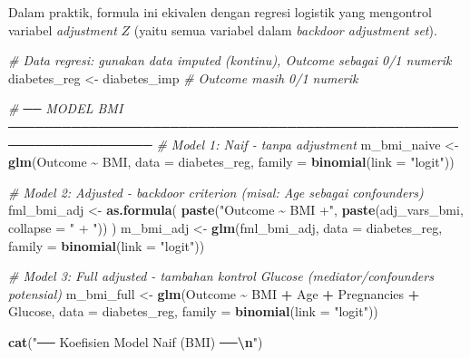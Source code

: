 \documentclass[
  11pt,
]{article}
\newenvironment{Shaded}{\begin{snugshade}}{\end{snugshade}}
\newcommand{\AttributeTok}[1]{\textcolor[rgb]{0.13,0.29,0.53}{#1}}
\newcommand{\CommentTok}[1]{\textcolor[rgb]{0.56,0.35,0.01}{\textit{#1}}}
\newcommand{\FunctionTok}[1]{\textcolor[rgb]{0.13,0.29,0.53}{\textbf{#1}}}
\newcommand{\NormalTok}[1]{#1}
\newcommand{\OtherTok}[1]{\textcolor[rgb]{0.56,0.35,0.01}{#1}}
\newcommand{\SpecialCharTok}[1]{\textcolor[rgb]{0.81,0.36,0.00}{\textbf{#1}}}
\newcommand{\StringTok}[1]{\textcolor[rgb]{0.31,0.60,0.02}{#1}}
\begin{document}
Dalam praktik, formula ini ekivalen dengan regresi logistik yang
mengontrol variabel \emph{adjustment} \(Z\) (yaitu semua variabel dalam
\emph{backdoor adjustment set}).

\begin{Shaded}
\begin{Highlighting}[]
\CommentTok{\# Data regresi: gunakan data imputed (kontinu), Outcome sebagai 0/1 numerik}
\NormalTok{diabetes\_reg }\OtherTok{\textless{}{-}}\NormalTok{ diabetes\_imp   }\CommentTok{\# Outcome masih 0/1 numerik}

\CommentTok{\# ── MODEL BMI ──────────────────────────────────────────────────────────────────}
\CommentTok{\# Model 1: Naif {-} tanpa adjustment}
\NormalTok{m\_bmi\_naive }\OtherTok{\textless{}{-}} \FunctionTok{glm}\NormalTok{(Outcome }\SpecialCharTok{\textasciitilde{}}\NormalTok{ BMI,}
                    \AttributeTok{data   =}\NormalTok{ diabetes\_reg,}
                    \AttributeTok{family =} \FunctionTok{binomial}\NormalTok{(}\AttributeTok{link =} \StringTok{"logit"}\NormalTok{))}

\CommentTok{\# Model 2: Adjusted {-} backdoor criterion (misal: Age sebagai confounders)}
\NormalTok{fml\_bmi\_adj }\OtherTok{\textless{}{-}} \FunctionTok{as.formula}\NormalTok{(}
  \FunctionTok{paste}\NormalTok{(}\StringTok{"Outcome \textasciitilde{} BMI +"}\NormalTok{, }\FunctionTok{paste}\NormalTok{(adj\_vars\_bmi, }\AttributeTok{collapse =} \StringTok{" + "}\NormalTok{))}
\NormalTok{)}
\NormalTok{m\_bmi\_adj }\OtherTok{\textless{}{-}} \FunctionTok{glm}\NormalTok{(fml\_bmi\_adj,}
                  \AttributeTok{data   =}\NormalTok{ diabetes\_reg,}
                  \AttributeTok{family =} \FunctionTok{binomial}\NormalTok{(}\AttributeTok{link =} \StringTok{"logit"}\NormalTok{))}

\CommentTok{\# Model 3: Full adjusted {-} tambahan kontrol Glucose (mediator/confounders potensial)}
\NormalTok{m\_bmi\_full }\OtherTok{\textless{}{-}} \FunctionTok{glm}\NormalTok{(Outcome }\SpecialCharTok{\textasciitilde{}}\NormalTok{ BMI }\SpecialCharTok{+}\NormalTok{ Age }\SpecialCharTok{+}\NormalTok{ Pregnancies }\SpecialCharTok{+}\NormalTok{ Glucose,}
                   \AttributeTok{data   =}\NormalTok{ diabetes\_reg,}
                   \AttributeTok{family =} \FunctionTok{binomial}\NormalTok{(}\AttributeTok{link =} \StringTok{"logit"}\NormalTok{))}

\FunctionTok{cat}\NormalTok{(}\StringTok{"── Koefisien Model Naif (BMI) ──}\SpecialCharTok{\textbackslash{}n}\StringTok{"}\NormalTok{)}
\end{Highlighting}
\end{Shaded}
\end{document}

